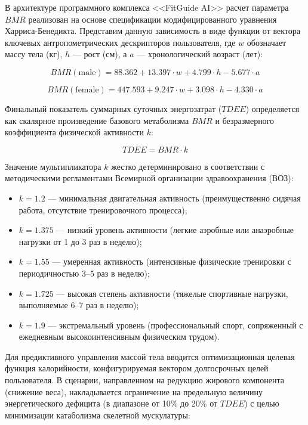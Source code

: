 \documentclass[14pt, a4paper]{extarticle}
\begin{document}
В архитектуре программного комплекса <<FitGuide AI>> расчет параметра $BMR$ реализован на основе спецификации модифицированного уравнения Харриса-Бенедикта. Представим данную зависимость в виде функции от вектора ключевых антропометрических дескрипторов пользователя, где $w$ обозначает массу тела (кг), $h$ — рост (см), а $a$ — хронологический возраст (лет):

\begin{equation}\label{bmr_male}
BMR(\text{male}) = 88.362 + 13.397 \cdot w + 4.799 \cdot h - 5.677 \cdot a
\end{equation}

\begin{equation}\label{bmr_female}
BMR(\text{female}) = 447.593 + 9.247 \cdot w + 3.098 \cdot h - 4.330 \cdot a
\end{equation}

Финальный показатель суммарных суточных энергозатрат ($TDEE$) определяется как скалярное произведение базового метаболизма $BMR$ и безразмерного коэффициента физической активности $k$:

\begin{equation}\label{tdee}
TDEE = BMR \cdot k
\end{equation}

Значение мультипликатора $k$ жестко детерминировано в соответствии с методическими регламентами Всемирной организации здравоохранения (ВОЗ):
\begin{itemize}
    \item $k = 1.2$ — минимальная двигательная активность (преимущественно сидячая работа, отсутствие тренировочного процесса);
    \item $k = 1.375$ — низкий уровень активности (легкие аэробные или анаэробные нагрузки от 1 до 3 раз в неделю);
    \item $k = 1.55$ — умеренная активность (интенсивные физические тренировки с периодичностью 3--5 раз в неделю);
    \item $k = 1.725$ — высокая степень активности (тяжелые спортивные нагрузки, выполняемые 6--7 раз в неделю);
    \item $k = 1.9$ — экстремальный уровень (профессиональный спорт, сопряженный с ежедневным высокоинтенсивным физическим трудом).
\end{itemize}

Для предиктивного управления массой тела вводится оптимизационная целевая функция калорийности, конфигурируемая вектором долгосрочных целей пользователя. В сценарии, направленном на редукцию жирового компонента (снижение веса), накладывается ограничение на предельную величину энергетического дефицита (в диапазоне от 10\% до 20\% от $TDEE$) с целью минимизации катаболизма скелетной мускулатуры:
\end{document}
